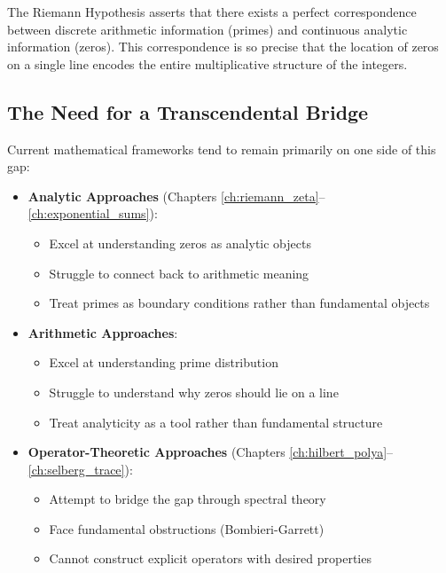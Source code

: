 \begin{insight}
The Riemann Hypothesis asserts that there exists a perfect correspondence between discrete arithmetic information (primes) and continuous analytic information (zeros). This correspondence is so precise that the location of zeros on a single line encodes the entire multiplicative structure of the integers.
\end{insight}

\subsection{The Need for a Transcendental Bridge}
\label{subsec:transcendental_bridge}

Current mathematical frameworks tend to remain primarily on one side of this gap:

\begin{itemize}
\item \textbf{Analytic Approaches} (Chapters \ref{ch:riemann_zeta}--\ref{ch:exponential_sums}):
  \begin{itemize}
  \item Excel at understanding zeros as analytic objects
  \item Struggle to connect back to arithmetic meaning
  \item Treat primes as boundary conditions rather than fundamental objects
  \end{itemize}

\item \textbf{Arithmetic Approaches}:
  \begin{itemize}
  \item Excel at understanding prime distribution
  \item Struggle to understand why zeros should lie on a line
  \item Treat analyticity as a tool rather than fundamental structure
  \end{itemize}

\item \textbf{Operator-Theoretic Approaches} (Chapters \ref{ch:hilbert_polya}--\ref{ch:selberg_trace}):
  \begin{itemize}
  \item Attempt to bridge the gap through spectral theory
  \item Face fundamental obstructions (Bombieri-Garrett)
  \item Cannot construct explicit operators with desired properties
  \end{itemize}
\end{itemize}

